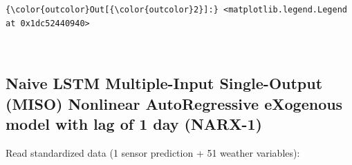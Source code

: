 \documentclass[11pt]{article}
\begin{document}
\begin{Verbatim}[commandchars=\\\{\}]
{\color{outcolor}Out[{\color{outcolor}2}]:} <matplotlib.legend.Legend at 0x1dc52440940>
\end{Verbatim}
            
    \begin{center}
    \end{center}
    { \hspace*{\fill} \\}
    
    \hypertarget{naive-lstm-multiple-input-single-output-miso-nonlinear-autoregressive-exogenous-model-with-lag-of-1-day-narx-1}{%
\subsection{Naive LSTM Multiple-Input Single-Output (MISO) Nonlinear
AutoRegressive eXogenous model with lag of 1 day
(NARX-1)}\label{naive-lstm-multiple-input-single-output-miso-nonlinear-autoregressive-exogenous-model-with-lag-of-1-day-narx-1}}

    Read standardized data (1 sensor prediction + 51 weather variables):
\end{document}
